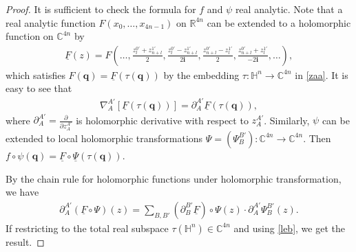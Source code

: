 \documentclass[a4paper,11pt]{amsart}
\numberwithin{equation}{section}
\begin{document}
\begin{proof}
It is sufficient to check the formula for $f$ and $\psi$ real analytic. Note that a real analytic function $F(x_0,\dots,x_{4n-1})$ on $\mathbb{R}^{4n}$ can be extended to a holomorphic function on $\mathbb{C}^{4n}$ by
\begin{equation}\begin{aligned}\label{holo extend}
\underline{F}(z)=F\left(\dots,\frac{z_{l}^{0'}+z_{n+l}^{1'}}{2},\frac{z_{l}^{0'}-z_{n+l}^{1'}}{2\mathbf{i}},\frac{z_{n+l}^{0'}-z_{l}^{1'}}{2},\frac{z_{n+l}^{0'}+z_{l}^{1'}}{-2\mathbf{i}},\dots\right),
\end{aligned}\end{equation}
which satisfies $F(\mathbf{q})=\underline{F}(\tau(\mathbf{q}))$ by the embedding $\tau:\mathbb{H}^n\rightarrow \mathbb{C}^{4n}$ in \eqref{zaa}.
It is easy to see that \cite[(3.9)]{wang4}
\begin{equation}\begin{aligned}\label{leb}
\nabla_A^{A'}[\underline{F}(\tau(\mathbf{q}))]=\partial_A^{A'}\underline{F}\left(\tau(\mathbf{q})\right),
\end{aligned}\end{equation}
where $\partial_A^{A'}=\frac{\partial}{\partial z_A^{A'}}$ is holomorphic derivative with respect to $z_A^{A'}$. Similarly, $\psi$ can be extended to local holomorphic transformations $\Psi=(\Psi_B^{B'}):\mathbb{C}^{4n}\rightarrow\mathbb{C}^{4n}$. Then $f\circ \psi(\mathbf{q})=\underline{F}\circ\underline{\Psi}(\tau(\mathbf{q}))$.

By the chain rule for holomorphic functions under holomorphic transformation, we have
\begin{equation*}\begin{aligned}
\partial_{A}^{A'}(\underline{F}\circ \Psi)(z)=\sum_{B,B'}(\partial_{B}^{B'}\underline{F})\circ\Psi(z)\cdot\partial_{A}^{A'}\Psi_{B}^{B'}(z).
\end{aligned}\end{equation*}
If restricting to the total real subspace $\tau(\mathbb{H}^n)\in \mathbb{C}^{4n}$ and using \eqref{leb}, we get the result.
\end{proof}
\end{document}
